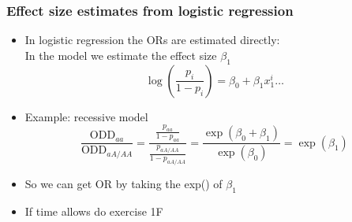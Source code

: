 \documentclass[xcolor=pdftex,dvipsnames,table,10pt]{beamer}
\begin{document}
\begin{frame}
  \frametitle{Effect size estimates from logistic regression}
\vspace{-1.4cm}\small
\begin{itemize}
  \item<1-> In logistic regression the ORs are estimated directly:\\ 
  In the model we estimate the effect size $\beta_1$
     \[ \log \left(\frac{p_i}{1-p_i}  \right)=\beta_0 +\beta_1x^i_1 \dots \] 
\item<2-> Example: recessive model
    \[ \frac{\text{ODD}_{aa}}{\text{ODD}_{aA/AA}} = \frac{ \frac{p_{aa}}{1-p_{aa}} }{\frac{p_{aA/AA}}{1-p_{aA/AA}} } =\frac{\exp(\beta_0 +\beta_1)}{\exp(\beta_0)} = \exp(\beta_1) \] 
\item<3-> So we can get OR by taking the exp() of $\beta_1$
\item<4-> If time allows do exercise 1F  
\end{itemize}
\end{frame}
\end{document}
